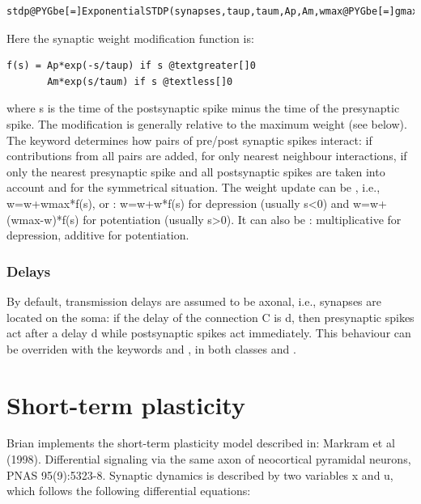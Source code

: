 \documentclass[letterpaper,10pt,english]{manual}
\begin{document}
\begin{Verbatim}[commandchars=@\[\]]
stdp@PYGbe[=]ExponentialSTDP(synapses,taup,taum,Ap,Am,wmax@PYGbe[=]gmax,interactions@PYGbe[=]@PYGad[']@PYGad[all]@PYGad['],update@PYGbe[=]@PYGad[']@PYGad[additive]@PYGad['])
\end{Verbatim}

Here the synaptic weight modification function is:

\begin{Verbatim}[commandchars=@\[\]]
f(s) = Ap*exp(-s/taup) if s @textgreater[]0
       Am*exp(s/taum) if s @textless[]0
\end{Verbatim}

where s is the time of the postsynaptic spike minus the time of the presynaptic spike.
The modification is generally relative to the maximum weight  (see below).
The  keyword determines
how pairs of pre/post synaptic spikes interact:  if contributions from
all pairs are added,  for only nearest neighbour interactions,
 if only the nearest presynaptic spike and all postsynaptic
spikes are taken into account and  for the symmetrical situation.
The weight update can be , i.e., w=w+wmax*f(s), or :
w=w+w*f(s) for depression (usually s\textless{}0) and w=w+(wmax-w)*f(s) for potentiation
(usually s\textgreater{}0). It can also be : multiplicative for depression, additive for
potentiation.


\subsubsection{Delays}

By default, transmission delays are assumed to be axonal, i.e., synapses are located
on the soma: if the delay of the connection C is d, then presynaptic spikes act after
a delay d while postsynaptic spikes act immediately. This behaviour can be overriden with
the keywords  and , in both classes  and
.

\resetcurrentobjects


\section{Short-term plasticity}

Brian implements the short-term plasticity model described in:
Markram et al (1998). Differential signaling via the same axon of neocortical
pyramidal neurons, PNAS 95(9):5323-8.
Synaptic dynamics is described by two variables x and u, which
follows the following differential equations:
\end{document}
